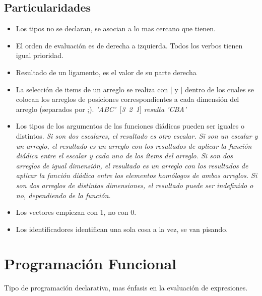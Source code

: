 \subsection*{Particularidades}
\begin{itemize}
\item Los tipos no se declaran, se asocian a lo mas cercano que tienen.
\item El orden de evaluación es de derecha a izquierda. Todos los verbos tienen igual prioridad.
\item Resultado de un ligamento, es el valor de su parte derecha
\item La selección de items de un arreglo se realiza con $[$ y $]$ dentro de los cuales se colocan los arreglos de posiciones correspondientes a cada dimensión del arreglo (separados por ;). \textit{'ABC'\ $[$3\ 2\ 1$]$ resulta 'CBA'}
\item Los tipos de los argumentos de las funciones diádicas pueden ser iguales o distintos. \textit{Si son dos escalares, el resultado es otro escalar. Si son un escalar y un arreglo, el resultado es un arreglo con los resultados de aplicar la función diádica entre el escalar y cada uno de los ítems del arreglo. Si son dos arreglos de igual dimensión, el resultado es un arreglo con los resultados de aplicar la función diádica entre los elementos homólogos de ambos arreglos. Si son dos arreglos de distintas dimensiones, el resultado puede ser indefinido o no, dependiendo de la función.}
\item Los vectores empiezan con 1, no con 0.
\item Los identificadores identifican una sola cosa a la vez, se van pisando.
\end{itemize}



\section{Programación Funcional}
Tipo de programación declarativa, mas énfasis en la evaluación de expresiones.

